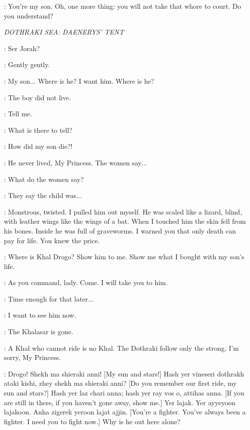 \TYWIN: You're my son. Oh, one more thing: you will not take that whore to court. Do you understand? 


\scene

\textit{DOTHRAKI SEA: DAENERYS' TENT}


\DAENERYS: Ser Jorah? 

\JORAH: Gently gently. 

\DAENERYS: My son$\ldots$ Where is he? I want him. Where is he? 

\JORAH: The boy did not live. 

\DAENERYS: Tell me. 

\JORAH: What is there to tell? 

\DAENERYS: How did my son die?! 

\JORAH: He never lived, My Princess. The women say$\ldots$ 

\DAENERYS: What do the women say? 

\JORAH: They say the child was$\ldots$  

\MIRRI: Monstrous, twisted. I pulled him out myself. He was scaled like a lizard, blind, with leather wings like the wings of a bat. When I touched him the skin fell from his bones. Inside he was full of graveworms. I warned you that only death can pay for life. You knew the price. 

\DAENERYS: Where is Khal Drogo? Show him to me. Show me what I bought with my son's life. 

\MIRRI: As you command, lady. Come. I will take you to him. 

\JORAH: Time enough for that later$\ldots$  

\DAENERYS: I want to see him now. 


\DAENERYS: The Khalasar is gone. 

\JORAH: A Khal who cannot ride is no Khal. The Dothraki follow only the strong. I'm sorry, My Princess. 


\DAENERYS: Drogo! Shekh ma shieraki anni! [My sun and stars!] Hash yer vineseri dothrakh ataki kishi, zhey shekh ma shieraki anni? [Do you remember our first ride, my sun and stars?] Hash yer laz chari anna; hash yer ray vos o, attihas anna. [If you are still in there, if you haven't gone away, show me.] Yer lajak. Yer ayyeyoon lajakoon. Anha zigerek yeroon lajat ajjin. [You're a fighter. You've always been a fighter. I need you to fight now.] Why is he out here alone? 

